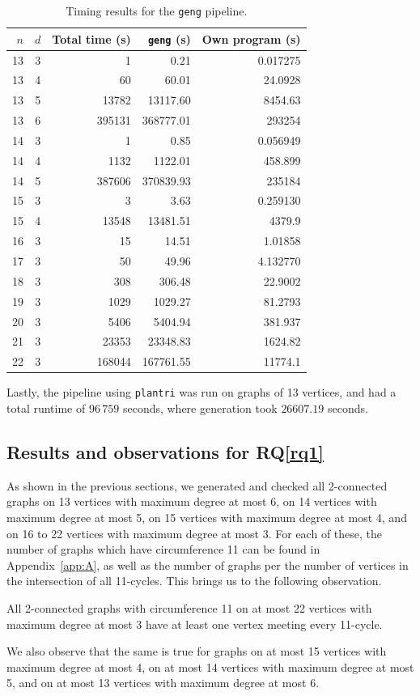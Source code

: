 \begin{table}[ht]
\centering
\caption{Timing results for the \texttt{geng} pipeline.}
\label{tab:geng-timings}
\begin{tabular}{rrr r r}
\toprule
$n$ & $d$ & Total time (s) & \texttt{geng} (s) & Own program (s) \\
\midrule
13 & 3 & 1 & 0.21 & 0.017275 \\
13 & 4 & 60 & 60.01 & 24.0928 \\
13 & 5 & 13782 & 13117.60 & 8454.63 \\
13 & 6 & 395131 & 368777.01 & 293254 \\
14 & 3 & 1 & 0.85 & 0.056949 \\
14 & 4 & 1132 & 1122.01 & 458.899 \\
14 & 5 & 387606 & 370839.93 & 235184 \\
15 & 3 & 3 & 3.63 & 0.259130 \\
15 & 4 & 13548 & 13481.51 & 4379.9 \\
16 & 3 & 15 & 14.51 & 1.01858 \\
17 & 3 & 50 & 49.96 & 4.132770 \\
18 & 3 & 308 & 306.48 & 22.9002 \\
19 & 3 & 1029 & 1029.27 & 81.2793 \\
20 & 3 & 5406 & 5404.94 & 381.937 \\
21 & 3 & 23353 & 23348.83 & 1624.82 \\
22 & 3 & 168044 & 167761.55 & 11774.1 \\
\bottomrule
\end{tabular}
\end{table}

Lastly, the pipeline using \texttt{plantri} was run on graphs of 13 vertices, and had a total runtime of $96\,759$ seconds, where generation took $26607.19$ seconds.

\subsection{Results and observations for RQ\ref{rq1}}

As shown in the previous sections, we generated and checked all 2-connected graphs on 13 vertices with maximum degree at most 6, on 14 vertices with maximum degree at most 5, on 15 vertices with maximum degree at most 4, and on 16 to 22 vertices with maximum degree at most 3. For each of these, the number of graphs which have circumference 11 can be found in Appendix~\ref{app:A}, as well as the number of graphs per the number of vertices in the intersection of all 11-cycles. This brings us to the following observation.
\begin{observation}
  All 2-connected graphs with circumference 11 on at most 22 vertices with maximum degree at most 3 have at least one vertex meeting every 11-cycle.
\end{observation}
We also observe that the same is true for graphs on at most 15 vertices with maximum degree at most 4, on at most 14 vertices with maximum degree at most 5, and on at most 13 vertices with maximum degree at most 6.

